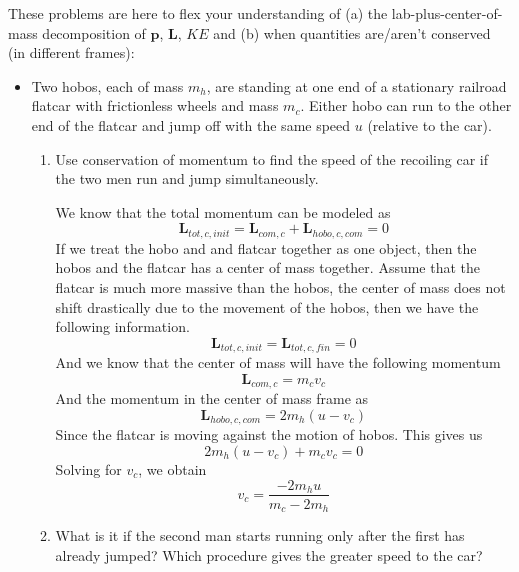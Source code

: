 \documentclass[12pt]{article}
\newcommand{\paren}[1]{\left( #1 \right)}
\begin{document}
These problems are here to flex your understanding of (a) the lab-plus-center-of-mass decomposition of $\mathbf{p}$, $\mathbf{L}$, $KE$ and (b) when quantities are/aren’t conserved (in different frames):

\begin{itemize}
    \item[T1 3.4]
        Two hobos, each of mass $m_h$, are standing at one end of a stationary railroad flatcar with frictionless wheels and mass $m_c$. Either hobo can run to the other end of the flatcar and jump off with the same speed $u$ (relative to the car). 
        \begin{enumerate}
            \item[(a)] Use conservation of momentum to find the speed of the recoiling car if the two men run and jump simultaneously.

            We know that the total momentum can be modeled as
            \[
            \mathbf{L}_{tot,c,init} = \mathbf{L}_{com,c} + \mathbf{L}_{hobo,c,com} = 0
            \]
            If we treat the hobo and and flatcar together as one object, then the hobos and the flatcar has a center of mass together. Assume that the flatcar is much more massive than the hobos, the center of mass does not shift drastically due to the movement of the hobos, then we have the following information. 
            \[
            \mathbf{L}_{tot,c,init} = \mathbf{L}_{tot,c,fin} = 0
            \]
            And we know that the center of mass will have the following momentum
            \[
            \mathbf{L}_{com,c} = m_cv_c
            \]
            And the momentum in the center of mass frame as
            \[
            \mathbf{L}_{hobo,c,com} = 2m_h\paren{u-v_c}
            \]
            Since the flatcar is moving against the motion of hobos. This gives us
            \[
            2m_h\paren{u-v_c} + m_cv_c = 0
            \]
            Solving for $v_c$, we obtain
            \[
            v_c = \frac{-2m_hu}{m_c - 2m_h}
            \]
            

            
            \item[(b)] What is it if the second man starts running only after the first has already jumped? Which procedure gives the greater speed to the car? 


\end{enumerate}
\end{itemize}
\end{document}
